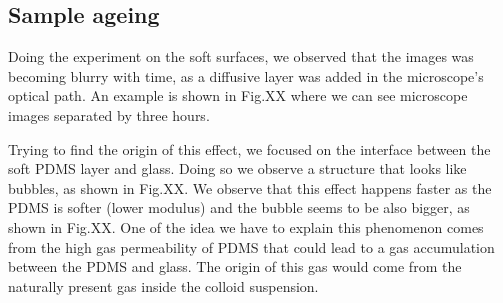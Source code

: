 \subsection{Sample ageing}

Doing the experiment on the soft surfaces, we observed that the images was becoming blurry with time, as a diffusive layer was added in the microscope's optical path. An example is shown in Fig.XX where we can see microscope images separated by three hours.


Trying to find the origin of this effect, we focused on the interface between the soft PDMS layer and glass. Doing so we observe a structure that looks like bubbles, as shown in Fig.XX. We observe that this effect happens faster as the PDMS is softer (lower modulus) and the bubble seems to be also bigger, as shown in Fig.XX. One of the idea we have to explain this phenomenon comes from the high gas permeability of PDMS that could lead to a gas accumulation between the PDMS and glass. The origin of this gas would come from the naturally present gas inside the colloid suspension.
